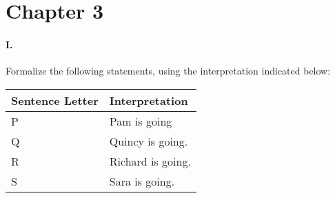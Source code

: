 \documentclass[12pt]{article}
\begin{document}
    \section*{Chapter 3}
    \paragraph{I.}
    Formalize the following statements, using the interpretation indicated below: \\
    
    \begin{tabular}{|l | l|}
    \hline
        Sentence Letter & Interpretation \\ \hline
        P & Pam is going \\
        Q & Quincy is going. \\
        R & Richard is going. \\
        S & Sara is going. \\ \hline
    \end{tabular}
    
\end{document}
